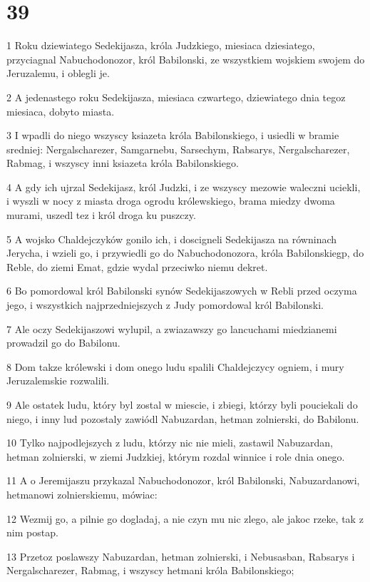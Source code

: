 \chapter{39}

\par 1 Roku dziewiatego Sedekijasza, króla Judzkiego, miesiaca dziesiatego, przyciagnal Nabuchodonozor, król Babilonski, ze wszystkiem wojskiem swojem do Jeruzalemu, i oblegli je.
\par 2 A jedenastego roku Sedekijasza, miesiaca czwartego, dziewiatego dnia tegoz miesiaca, dobyto miasta.
\par 3 I wpadli do niego wszyscy ksiazeta króla Babilonskiego, i usiedli w bramie sredniej: Nergalscharezer, Samgarnebu, Sarsechym, Rabsarys, Nergalscharezer, Rabmag, i wszyscy inni ksiazeta króla Babilonskiego.
\par 4 A gdy ich ujrzal Sedekijasz, król Judzki, i ze wszyscy mezowie waleczni uciekli, i wyszli w nocy z miasta droga ogrodu królewskiego, brama miedzy dwoma murami, uszedl tez i król droga ku puszczy.
\par 5 A wojsko Chaldejczyków gonilo ich, i doscigneli Sedekijasza na równinach Jerycha, i wzieli go, i przywiedli go do Nabuchodonozora, króla Babilonskiegp, do Reble, do ziemi Emat, gdzie wydal przeciwko niemu dekret.
\par 6 Bo pomordowal król Babilonski synów Sedekijaszowych w Rebli przed oczyma jego, i wszystkich najprzedniejszych z Judy pomordowal król Babilonski.
\par 7 Ale oczy Sedekijaszowi wylupil, a zwiazawszy go lancuchami miedzianemi prowadzil go do Babilonu.
\par 8 Dom takze królewski i dom onego ludu spalili Chaldejczycy ogniem, i mury Jeruzalemskie rozwalili.
\par 9 Ale ostatek ludu, który byl zostal w miescie, i zbiegi, którzy byli pouciekali do niego, i inny lud pozostaly zawiódl Nabuzardan, hetman zolnierski, do Babilonu.
\par 10 Tylko najpodlejszych z ludu, którzy nic nie mieli, zastawil Nabuzardan, hetman zolnierski, w ziemi Judzkiej, którym rozdal winnice i role dnia onego.
\par 11 A o Jeremijaszu przykazal Nabuchodonozor, król Babilonski, Nabuzardanowi, hetmanowi zolnierskiemu, mówiac:
\par 12 Wezmij go, a pilnie go dogladaj, a nie czyn mu nic zlego, ale jakoc rzeke, tak z nim postap.
\par 13 Przetoz poslawszy Nabuzardan, hetman zolnierski, i Nebusasban, Rabsarys i Nergalscharezer, Rabmag, i wszyscy hetmani króla Babilonskiego;
